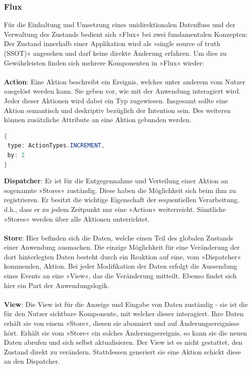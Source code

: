 \subsubsection{Flux}
Für die Einhaltung und Umsetzung eines unidirektionalen Datenfluss und der Verwaltung des Zustands bedient sich »Flux« bei zwei fundamentalen Konzepten: Der Zustand innerhalb einer Applikation wird als »single source of truth (SSOT)« angesehen und darf keine direkte Änderung erfahren. Um dies zu Gewährleisten finden sich mehrere Komponenten in »Flux« wieder:
\\
\\
\textbf{Action}: Eine Aktion beschreibt ein Ereignis, welches unter anderem vom Nutzer ausgelöst werden kann. Sie geben vor, wie mit der Anwendung interagiert wird. Jeder dieser Aktionen wird dabei ein Typ zugewiesen. Insgesamt sollte eine Aktion semantisch und deskriptiv bezüglich der Intention sein. Des weiteren können zusätzliche Attribute an eine Aktion gebunden werden.
\\
\begin{lstlisting}[frame=single, language=Java]
{
 type: ActionTypes.INCREMENT,
 by: 2
}
\end{lstlisting}
\bigskip
\textbf{Dispatcher}: Er ist für die Entgegennahme und Verteilung einer Aktion an sogenannte »Stores« zuständig. Diese haben die Möglichkeit sich beim ihm zu registrieren. Er besitzt die wichtige Eigenschaft der sequentiellen Verarbeitung, d.h., dass er zu jedem Zeitpunkt nur eine »Action« weiterreicht. Sämtliche »Stores« werden über alle Aktionen unterrichtet.
\\
\\
\textbf{Store}: Hier befinden sich die Daten, welche einen Teil des globalen Zustands einer Anwendung ausmachen. Die einzige Möglichkeit für eine Veränderung der dort hinterlegten Daten besteht durch ein Reaktion auf eine, vom »Dispatcher« kommenden, Aktion. Bei jeder Modifikation der Daten erfolgt die Aussendung eines Events an eine »View«, das die Veränderung mitteilt.
Ebenso findet sich hier ein Part der Anwendungslogik.
\\
\\
\textbf{View}: Die View ist für die Anzeige und Eingabe von Daten zuständig - sie ist die für den Nutzer sichtbare Komponente, mit welcher dieser interagiert. Ihre Daten erhält sie von einem »Store«, diesen sie abonniert und auf Änderungsereignisse hört. Erhält sie vom »Store« ein solches Änderungsereignis, so kann sie die neuen Daten abrufen und sich selbst aktualisieren. Der View ist es nicht gestattet, den Zustand direkt zu verändern. Stattdessen generiert sie eine Aktion schickt diese an den Dispatcher.
